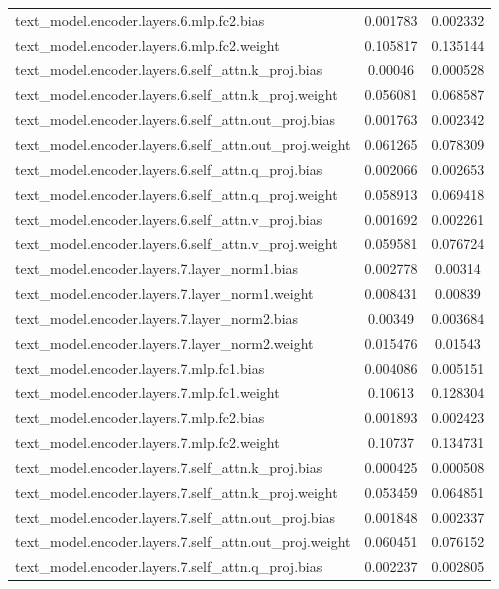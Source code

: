 \begin{longtable}{lcc}
text\_model.encoder.layers.6.mlp.fc2.bias & 0.001783 & 0.002332 \\
text\_model.encoder.layers.6.mlp.fc2.weight & 0.105817 & 0.135144 \\
text\_model.encoder.layers.6.self\_attn.k\_proj.bias & 0.00046 & 0.000528 \\
text\_model.encoder.layers.6.self\_attn.k\_proj.weight & 0.056081 & 0.068587 \\
text\_model.encoder.layers.6.self\_attn.out\_proj.bias & 0.001763 & 0.002342 \\
text\_model.encoder.layers.6.self\_attn.out\_proj.weight & 0.061265 & 0.078309 \\
text\_model.encoder.layers.6.self\_attn.q\_proj.bias & 0.002066 & 0.002653 \\
text\_model.encoder.layers.6.self\_attn.q\_proj.weight & 0.058913 & 0.069418 \\
text\_model.encoder.layers.6.self\_attn.v\_proj.bias & 0.001692 & 0.002261 \\
text\_model.encoder.layers.6.self\_attn.v\_proj.weight & 0.059581 & 0.076724 \\
text\_model.encoder.layers.7.layer\_norm1.bias & 0.002778 & 0.00314 \\
text\_model.encoder.layers.7.layer\_norm1.weight & 0.008431 & 0.00839 \\
text\_model.encoder.layers.7.layer\_norm2.bias & 0.00349 & 0.003684 \\
text\_model.encoder.layers.7.layer\_norm2.weight & 0.015476 & 0.01543 \\
text\_model.encoder.layers.7.mlp.fc1.bias & 0.004086 & 0.005151 \\
text\_model.encoder.layers.7.mlp.fc1.weight & 0.10613 & 0.128304 \\
text\_model.encoder.layers.7.mlp.fc2.bias & 0.001893 & 0.002423 \\
text\_model.encoder.layers.7.mlp.fc2.weight & 0.10737 & 0.134731 \\
text\_model.encoder.layers.7.self\_attn.k\_proj.bias & 0.000425 & 0.000508 \\
text\_model.encoder.layers.7.self\_attn.k\_proj.weight & 0.053459 & 0.064851 \\
text\_model.encoder.layers.7.self\_attn.out\_proj.bias & 0.001848 & 0.002337 \\
text\_model.encoder.layers.7.self\_attn.out\_proj.weight & 0.060451 & 0.076152 \\
text\_model.encoder.layers.7.self\_attn.q\_proj.bias & 0.002237 & 0.002805 \\

\end{longtable}
